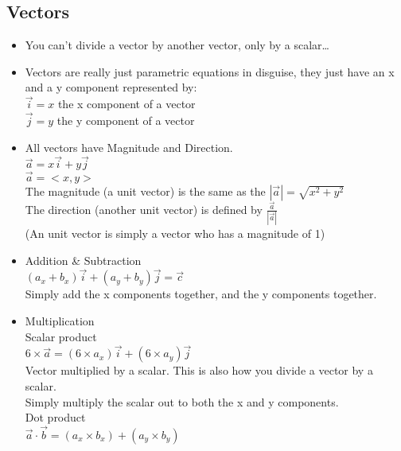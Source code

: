 \documentclass{article}
\begin{document}
  \subsection*{\color{BrickRed}Vectors}
  \begin{itemize}
    \item You can't divide a vector by another vector, only by a scalar\ldots\\
    \item Vectors are really just parametric equations in
      disguise, they just have an x and a y component represented
      by:\\
    \subitem $\vec{i}=x$ the x component of a vector\\
    \subitem $\vec{j}=y$ the y component of a vector\\
    \item All vectors have Magnitude and Direction.\\
      \subitem $ \vec{a}=x\vec{i}+y\vec{j} $\\
      \subitem $ \vec{a}=<x,y>$\\
        \subsubitem The magnitude (a unit vector) is the same as the $|\vec{a}|=\sqrt{x^{2}+y^{2}}$\\
	\subsubitem The direction (another unit vector) is defined by $\frac{\vec{a}}{|\vec{a}|}$\\
	\subsubitem (An unit vector is simply a vector who has a 
	magnitude of 1)\\
    \item Addition \& Subtraction\\
      \subitem $(a_x+b_x)\vec{i}+(a_y+b_y)\vec{j}=\vec{c}$\\
      \subitem Simply add the x components together, and the y
      components together.\\ 
    \item Multiplication\\
      \subitem Scalar product\\
      	\subsubitem $6 \times \vec{a}=(6\times
	a_x)\vec{i}+(6\times a_y)\vec{j}$\\
        \subsubitem Vector multiplied by a scalar. This is also how you divide a vector by a
	scalar.\\
        \subsubitem Simply multiply the scalar out to both the x
	and y components.\\
      \subitem Dot product\\
      \subsubitem $\vec{a}\cdot \vec{b}=(a_x\times b_x)+(a_y
      \times b_y)$\\

\end{itemize}
\end{document}
